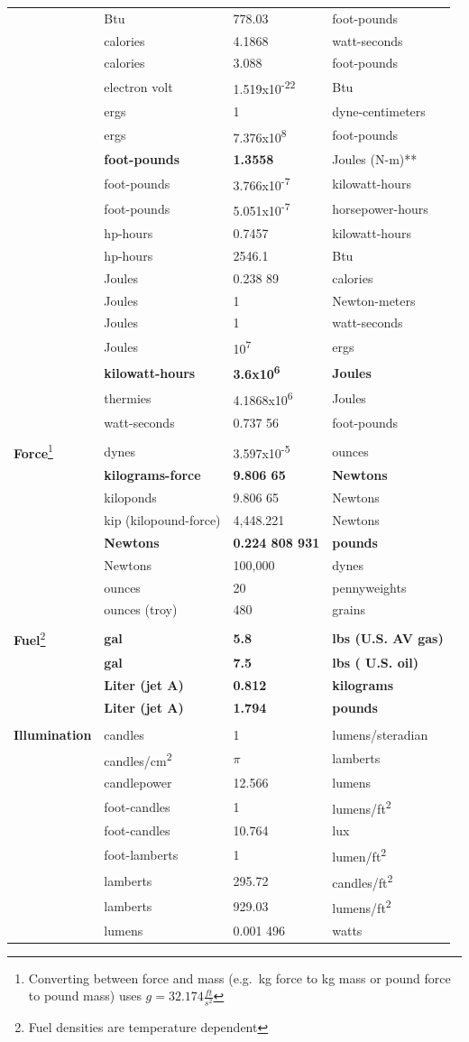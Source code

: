 \documentclass[
]{book}
\begin{document}
\begin{longtable}[]{@{}llll@{}}
& Btu & 778.03 & foot-pounds\tabularnewline
& calories & 4.1868 & watt-seconds\tabularnewline
& calories & 3.088 & foot-pounds\tabularnewline
& electron volt & 1.519x10\textsuperscript{-22} & Btu\tabularnewline
& ergs & 1 & dyne-centimeters\tabularnewline
& ergs & 7.376x10\textsuperscript{8} & foot-pounds\tabularnewline
& \textbf{foot-pounds} & \textbf{1.3558} & Joules (N-m)**\tabularnewline
& foot-pounds & 3.766x10\textsuperscript{-7} & kilowatt-hours\tabularnewline
& foot-pounds & 5.051x10\textsuperscript{-7} & horsepower-hours\tabularnewline
& hp-hours & 0.7457 & kilowatt-hours\tabularnewline
& hp-hours & 2546.1 & Btu\tabularnewline
& Joules & 0.238 89 & calories\tabularnewline
& Joules & 1 & Newton-meters\tabularnewline
& Joules & 1 & watt-seconds\tabularnewline
& Joules & 10\textsuperscript{7} & ergs\tabularnewline
& \textbf{kilowatt-hours} & \textbf{3.6x10\textsuperscript{6}} & \textbf{Joules}\tabularnewline
& thermies & 4.1868x10\textsuperscript{6} & Joules\tabularnewline
& watt-seconds & 0.737 56 & foot-pounds\tabularnewline
& & &\tabularnewline
\textbf{Force}\footnote{Converting between force and mass (e.g.~kg force to kg mass or pound force to pound mass) uses \(g = 32.174 \frac{ft}{s^2}\)} & dynes & 3.597x10\textsuperscript{-5} & ounces\tabularnewline
& \textbf{kilograms-force} & \textbf{9.806 65} & \textbf{Newtons}\tabularnewline
& kiloponds & 9.806 65 & Newtons\tabularnewline
& kip (kilopound-force) & 4,448.221 & Newtons\tabularnewline
& \textbf{Newtons} & \textbf{0.224 808 931} & \textbf{pounds}\tabularnewline
& Newtons & 100,000 & dynes\tabularnewline
& ounces & 20 & pennyweights\tabularnewline
& ounces (troy) & 480 & grains\tabularnewline
& & &\tabularnewline
\textbf{Fuel}\footnote{Fuel densities are temperature dependent} & \textbf{gal} & \textbf{5.8} & \textbf{lbs (U.S. AV gas)}\tabularnewline
& \textbf{gal} & \textbf{7.5} & \textbf{lbs ( U.S. oil)}\tabularnewline
& \textbf{Liter (jet A)} & \textbf{0.812} & \textbf{kilograms}\tabularnewline
& \textbf{Liter (jet A)} & \textbf{1.794} & \textbf{pounds}\tabularnewline
& & &\tabularnewline
\textbf{Illumination} & candles & 1 & lumens/steradian\tabularnewline
& candles/cm\textsuperscript{2} & \(\pi\) & lamberts\tabularnewline
& candlepower & 12.566 & lumens\tabularnewline
& foot-candles & 1 & lumens/ft\textsuperscript{2}\tabularnewline
& foot-candles & 10.764 & lux\tabularnewline
& foot-lamberts & 1 & lumen/ft\textsuperscript{2}\tabularnewline
& lamberts & 295.72 & candles/ft\textsuperscript{2}\tabularnewline
& lamberts & 929.03 & lumens/ft\textsuperscript{2}\tabularnewline
& lumens & 0.001 496 & watts\tabularnewline

\end{longtable}
\end{document}
